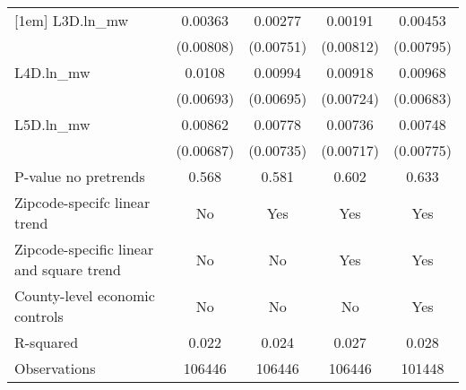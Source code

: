 {\begin{tabular}{l*{4}{c}}
[1em]
L3D.ln\_mw &  0.00363         &  0.00277         &  0.00191         &  0.00453         \\
          &(0.00808)         &(0.00751)         &(0.00812)         &(0.00795)         \\
[1em]
L4D.ln\_mw &   0.0108         &  0.00994         &  0.00918         &  0.00968         \\
          &(0.00693)         &(0.00695)         &(0.00724)         &(0.00683)         \\
[1em]
L5D.ln\_mw &  0.00862         &  0.00778         &  0.00736         &  0.00748         \\
          &(0.00687)         &(0.00735)         &(0.00717)         &(0.00775)         \\
\hline
P-value no pretrends&    0.568         &    0.581         &    0.602         &    0.633         \\
Zipcode-specifc linear trend&       No         &      Yes         &      Yes         &      Yes         \\
Zipcode-specific linear and square trend&       No         &       No         &      Yes         &      Yes         \\
County-level economic controls&       No         &       No         &       No         &      Yes         \\
R-squared &    0.022         &    0.024         &    0.027         &    0.028         \\
Observations&   106446         &   106446         &   106446         &   101448         \\
\hline\hline
\end{tabular}
}
